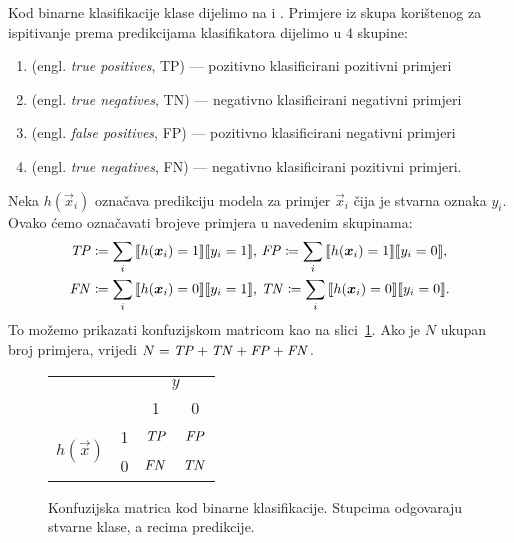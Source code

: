 \documentclass[utf8, diplomski, lmodern]{fer}
\begin{document}
Kod binarne klasifikacije klase dijelimo na  i . Primjere iz skupa korištenog za ispitivanje prema predikcijama klasifikatora dijelimo u $4$ skupine:
\begin{enumerate}[topsep=0pt,itemsep=0pt,partopsep=0pt]
	\item {} (engl. \textit{true positives}, TP) --- pozitivno klasificirani pozitivni primjeri
	\item {} (engl. \textit{true negatives}, TN) --- negativno klasificirani negativni primjeri
	\item {} (engl. \textit{false positives}, FP) --- pozitivno klasificirani negativni primjeri
	\item {} (engl. \textit{true negatives}, FN) --- negativno klasificirani pozitivni primjeri.
\end{enumerate}
Neka $h(\vec x_i)$ označava predikciju modela za primjer $\vec x_i$ čija je stvarna oznaka $y_i$. Ovako ćemo označavati brojeve primjera u navedenim skupinama:
\begin{align}
\begin{aligned}
\TP&\coloneqq\sum_i\enbbracket{h(\vec x_i)=1}\enbbracket{y_i=1} \text{, }
\FP\coloneqq\sum_i\enbbracket{h(\vec x_i)=1}\enbbracket{y_i=0} \text{,} \\
\FN&\coloneqq\sum_i\enbbracket{h(\vec x_i)=0}\enbbracket{y_i=1} \text{, }
\TN\coloneqq\sum_i\enbbracket{h(\vec x_i)=0}\enbbracket{y_i=0} \text{.}
\end{aligned}
\end{align}
To možemo prikazati konfuzijskom matricom kao na slici~\ref{fig:konfuzijska-matrica}. Ako je $N$ ukupan broj primjera, vrijedi $N=\mathit{TP}+\mathit{TN}+\mathit{FP}+\mathit{FN}$. 

\begin{figure}
	\centering
	\begin{tabular}{cccc}
	&                        & \multicolumn{2}{c}{$y$}                                 \\ \cline{3-4} 
	& \multicolumn{1}{c|}{}  & \multicolumn{1}{c|}{1}     & \multicolumn{1}{c|}{0}     \\ \cline{2-4} 
	\multicolumn{1}{c|}{\multirow{2}{*}{$h(\vec x)$}} & \multicolumn{1}{c|}{1} & \multicolumn{1}{c|}{$\mathit{TP}$} & \multicolumn{1}{c|}{$\mathit{FP}$} \\ \cline{2-4} 
	\multicolumn{1}{c|}{}                             & \multicolumn{1}{c|}{0} & \multicolumn{1}{c|}{$\mathit{FN}$} & \multicolumn{1}{c|}{$\mathit{TN}$} \\ \cline{2-4} 
	\end{tabular}
	\caption{Konfuzijska matrica kod binarne klasifikacije. Stupcima odgovaraju stvarne klase, a recima predikcije.}
	\label{fig:konfuzijska-matrica}
\end{figure}
\end{document}
